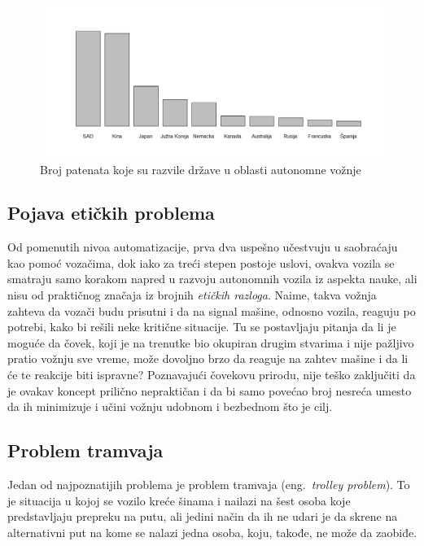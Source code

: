 \documentclass[a4paper]{article}
\begin{document}
\begin{figure}[h!]
\begin{center}
\includegraphics[scale=0.41]{slika.png}
\end{center}
\caption{Broj patenata koje su razvile države u oblasti autonomne vožnje \cite{vehicle_data}} 
\label{fig:histograma}
\end{figure} 

\subsection{Pojava etičkih problema}
\label{subsec:Pojava etičkih problema}
Od pomenutih nivoa automatizacije, prva dva uspešno učestvuju u saobraćaju kao pomoć vozačima, dok iako za treći stepen postoje uslovi, ovakva vozila se smatraju samo korakom napred u razvoju autonomnih vozila iz aspekta nauke, ali nisu od praktičnog značaja iz brojnih \emph{etičkih razloga}. \cite{eticki_problemi_vozila}
Naime, takva vožnja zahteva da vozači budu prisutni i da na signal mašine, odnosno vozila, reaguju po potrebi, kako bi rešili neke kritične situacije. Tu se postavljaju pitanja da li je moguće da čovek, koji je na trenutke bio okupiran drugim stvarima i nije pažljivo pratio vožnju sve vreme, može dovoljno brzo da reaguje na zahtev mašine i da li će te reakcije biti ispravne? Poznavajući čovekovu prirodu, nije teško zaključiti da je ovakav koncept prilično nepraktičan i da bi samo povećao broj nesreća umesto da ih minimizuje i učini vožnju udobnom i bezbednom što je cilj.

\subsection{Problem tramvaja}
\label{subsec:Pojava etičkih problema}
Jedan od najpoznatijih problema je problem tramvaja (eng.~{\em trolley problem}). To je situacija u kojoj se vozilo kreće šinama i nailazi na šest osoba koje predstavljaju prepreku na putu, ali jedini način da ih ne udari je da skrene na alternativni put na kome se nalazi jedna osoba, koju, takođe, ne može da zaobiđe.
\end{document}

